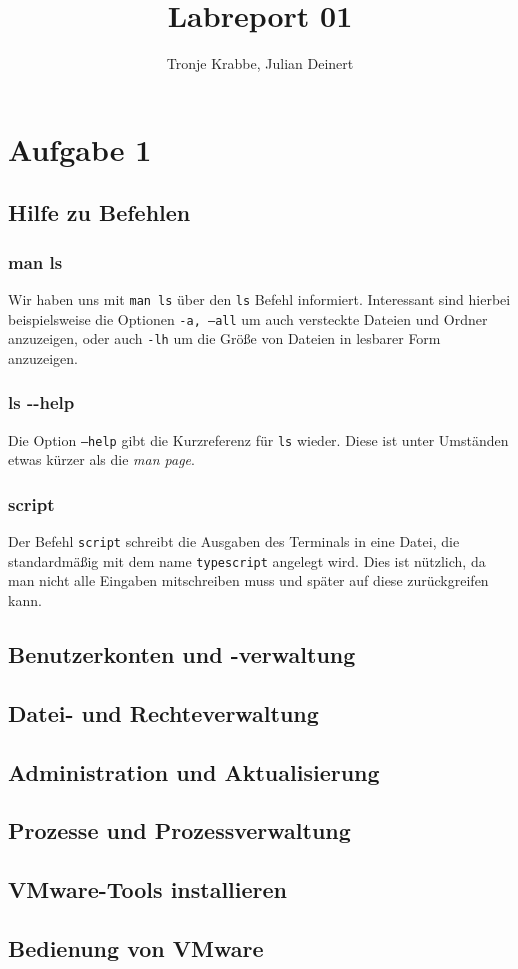 \documentclass[12pt,a4paper]{article}
\author{Tronje Krabbe, Julian Deinert}
\title{Labreport 01}
\begin{document}
\maketitle
\tableofcontents
\newpage


\section*{Aufgabe 1}
\subsection{Hilfe zu Befehlen}
\subsubsection{man ls}
Wir haben uns mit \texttt{man ls} über den \texttt{ls} Befehl informiert.
Interessant sind hierbei beispielsweise die Optionen \texttt{-a, ---all} um auch versteckte Dateien und Ordner anzuzeigen, oder auch \texttt{-lh} um die Größe von Dateien in lesbarer Form anzuzeigen.
\subsubsection{ls \--\--help}
Die Option \texttt{---help} gibt die Kurzreferenz für \texttt{ls} wieder. Diese ist unter Umständen etwas kürzer als die \textit{man page}.
\subsubsection{script}
Der Befehl \texttt{script} schreibt die Ausgaben des Terminals in eine Datei, die standardmäßig mit dem name \texttt{typescript} angelegt wird. Dies ist nützlich, da man nicht alle Eingaben mitschreiben muss und später auf diese zurückgreifen kann.
\subsection{Benutzerkonten und -verwaltung}
\subsection{Datei- und Rechteverwaltung}
\subsection{Administration und Aktualisierung}
\subsection{Prozesse und Prozessverwaltung}
\subsection{VMware-Tools installieren}
\subsection{Bedienung von VMware}
\end{document}
